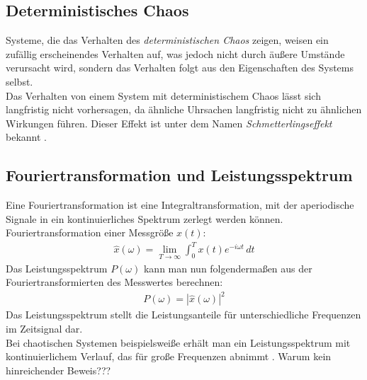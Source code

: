 \subsection{Deterministisches Chaos}
\label{sub:determChaos}
Systeme, die das Verhalten des \textit{deterministischen Chaos} zeigen, weisen ein zufällig erscheinendes Verhalten auf, was jedoch nicht durch äußere Umstände verursacht wird, sondern das Verhalten folgt aus den Eigenschaften des Systems selbst.\\
Das Verhalten von einem System mit deterministischem Chaos lässt sich langfristig nicht vorhersagen, da ähnliche Uhrsachen langfristig nicht zu ähnlichen Wirkungen führen. Dieser Effekt ist unter dem Namen \textit{Schmetterlingseffekt} bekannt \citep{WikiDetChaos}.

\subsection{Fouriertransformation und Leistungsspektrum}
\label{sub:fouriertrafo}
Eine Fouriertransformation ist eine Integraltransformation, mit der aperiodische Signale in ein kontinuierliches Spektrum zerlegt werden können.\\
Fouriertransformation einer Messgröße \(x(t)\):
\begin{gather}
    \hat{x}(\omega) = \lim_{T \to \infty} \int_{0}^{T}  x(t) e^{-i\omega t}\,dt 
\end{gather}
Das Leistungsspektrum \( P(\omega)\) kann man nun folgendermaßen aus der Fouriertransformierten des Messwertes berechnen:
\begin{gather}
    P(\omega) = |\hat{x}(\omega)|^2
\end{gather}
Das Leistungsspektrum stellt die Leistungsanteile für unterschiedliche Frequenzen im Zeitsignal dar.\\
Bei chaotischen Systemen beispielsweiße erhält man ein Leistungsspektrum mit kontinuierlichem Verlauf, das für große Frequenzen abnimmt \citep{Lueck}. Warum kein hinreichender Beweis??? 

